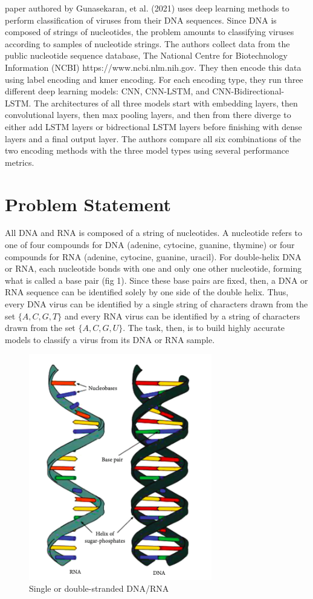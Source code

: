 \documentclass[journal]{IEEEtran}
\begin{document}
%
 paper authored by Gunasekaran, et al. (2021) uses deep learning methods 
to perform classification of viruses from their DNA sequences. Since DNA is composed of strings
of nucleotides, the problem amounts to classifying viruses according to samples of nucleotide
strings. The authors collect data from the public nucleotide sequence database,
The National Centre for Biotechnology Information (NCBI) https://www.ncbi.nlm.nih.gov.
They then encode this data using label encoding and kmer encoding. For each encoding type,
they run three different deep learning models: CNN, CNN-LSTM, and CNN-Bidirectional-LSTM.
The architectures of all three models start with embedding layers, then convolutional layers,
then max pooling layers, and then from there diverge to either add LSTM layers or 
bidrectional LSTM layers before finishing with dense layers and a final output layer.
The authors compare all six combinations of the two encoding methods with the three model types
using several performance metrics.

\section{Problem Statement}
All DNA and RNA is composed of a string of nucleotides. A nucleotide refers to one of
four compounds for DNA (adenine, cytocine, guanine, thymine) or four compounds for RNA
(adenine, cytocine, guanine, uracil). For double-helix DNA or RNA, each nucleotide
bonds with one and only one other nucleotide, forming what is called a base pair (fig 1). Since
these base pairs are fixed, then, a DNA or RNA sequence can be identified solely by one
side of the double helix. Thus, every DNA virus can be identified by a single string of
characters drawn from the set $\{A, C, G, T\}$ and every RNA virus can be identified by a string
of characters drawn from the set $\{A, C, G, U\}$. The task, then, is to build highly accurate
models to classify a virus from its DNA or RNA sample.

\begin{figure}[h]
  \centering
  \includegraphics[width=8cm]{figures/dna.png}
  \caption{Single or double-stranded DNA/RNA}
\end{figure}
\end{document}
